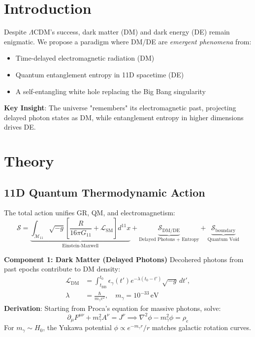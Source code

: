 \documentclass[12pt, a4paper]{article}
\begin{document}
\section{Introduction}  
\label{sec:intro}  
Despite \(\Lambda\)CDM's success, dark matter (DM) and dark energy (DE) remain enigmatic. We propose a paradigm where DM/DE are \textit{emergent phenomena} from:  
\begin{itemize}  
\item Time-delayed electromagnetic radiation (DM)  
\item Quantum entanglement entropy in 11D spacetime (DE)  
\item A self-entangling white hole replacing the Big Bang singularity  
\end{itemize}  
\textbf{Key Insight}: The universe "remembers" its electromagnetic past, projecting delayed photon states as DM, while entanglement entropy in higher dimensions drives DE.  

\section{Theory}  
\label{sec:theory}  

\subsection{11D Quantum Thermodynamic Action}  
\label{subsec:action}  
The total action unifies GR, QM, and electromagnetism:  
\begin{equation}  
\mathcal{S} = \underbrace{\int_{\mathcal{M}_{11}} \sqrt{-g} \left[ \frac{R}{16\pi G_{11}} + \mathcal{L}_{\text{SM}} \right] d^{11}x}_{\text{Einstein-Maxwell}} + \underbrace{\mathcal{S}_{\text{DM/DE}}}_{\text{Delayed Photons + Entropy}} + \underbrace{\mathcal{S}_{\text{boundary}}}_{\text{Quantum Void}}  
\label{eq:total_action}  
\end{equation}  

\textbf{Component 1: Dark Matter (Delayed Photons)}  
Decohered photons from past epochs contribute to DM density:  
\begin{align}  
\mathcal{L}_{\text{DM}} &= \int_{t_{\text{BB}}}^{t_0} \epsilon_\gamma(t') e^{-\lambda(t_0 - t')} \sqrt{-g} \, dt', \\  
\lambda &= \frac{\hbar}{m_\gamma c^2}, \quad m_\gamma = 10^{-33} \, \text{eV}  
\label{eq:dm_lagrangian}  
\end{align}  
\textbf{Derivation}: Starting from Proca's equation for massive photons, solve:  
\begin{equation}  
\partial_\mu F^{\mu\nu} + m_\gamma^2 A^\nu = J^\nu \implies \nabla^2 \phi - m_\gamma^2 \phi = \rho_e  
\label{eq:proca}  
\end{equation}  
For \( m_\gamma \sim H_0 \), the Yukawa potential \( \phi \propto e^{-m_\gamma r}/r \) matches galactic rotation curves.  
\end{document}
